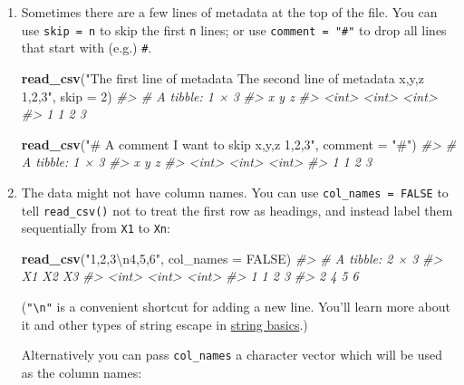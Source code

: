 \documentclass[]{book}
\newenvironment{Shaded}{\begin{snugshade}}{\end{snugshade}}
\newcommand{\KeywordTok}[1]{\textcolor[rgb]{0.13,0.29,0.53}{\textbf{{#1}}}}
\newcommand{\DataTypeTok}[1]{\textcolor[rgb]{0.13,0.29,0.53}{{#1}}}
\newcommand{\DecValTok}[1]{\textcolor[rgb]{0.00,0.00,0.81}{{#1}}}
\newcommand{\CharTok}[1]{\textcolor[rgb]{0.31,0.60,0.02}{{#1}}}
\newcommand{\StringTok}[1]{\textcolor[rgb]{0.31,0.60,0.02}{{#1}}}
\newcommand{\CommentTok}[1]{\textcolor[rgb]{0.56,0.35,0.01}{\textit{{#1}}}}
\newcommand{\OtherTok}[1]{\textcolor[rgb]{0.56,0.35,0.01}{{#1}}}
\newcommand{\NormalTok}[1]{{#1}}
\begin{document}
\begin{enumerate}
\def\labelenumi{\arabic{enumi}.}
\item
  Sometimes there are a few lines of metadata at the top of the file.
  You can use \texttt{skip\ =\ n} to skip the first \texttt{n} lines; or
  use \texttt{comment\ =\ "\#"} to drop all lines that start with (e.g.)
  \texttt{\#}.

\begin{Shaded}
\begin{Highlighting}[]
\KeywordTok{read_csv}\NormalTok{(}\StringTok{"The first line of metadata}
\StringTok{  The second line of metadata}
\StringTok{  x,y,z}
\StringTok{  1,2,3"}\NormalTok{, }\DataTypeTok{skip =} \DecValTok{2}\NormalTok{)}
\CommentTok{#> # A tibble: 1 × 3}
\CommentTok{#>       x     y     z}
\CommentTok{#>   <int> <int> <int>}
\CommentTok{#> 1     1     2     3}

\KeywordTok{read_csv}\NormalTok{(}\StringTok{"# A comment I want to skip}
\StringTok{  x,y,z}
\StringTok{  1,2,3"}\NormalTok{, }\DataTypeTok{comment =} \StringTok{"#"}\NormalTok{)}
\CommentTok{#> # A tibble: 1 × 3}
\CommentTok{#>       x     y     z}
\CommentTok{#>   <int> <int> <int>}
\CommentTok{#> 1     1     2     3}
\end{Highlighting}
\end{Shaded}
\item
  The data might not have column names. You can use
  \texttt{col\_names\ =\ FALSE} to tell \texttt{read\_csv()} not to
  treat the first row as headings, and instead label them sequentially
  from \texttt{X1} to \texttt{Xn}:

\begin{Shaded}
\begin{Highlighting}[]
\KeywordTok{read_csv}\NormalTok{(}\StringTok{"1,2,3}\CharTok{\textbackslash{}n}\StringTok{4,5,6"}\NormalTok{, }\DataTypeTok{col_names =} \OtherTok{FALSE}\NormalTok{)}
\CommentTok{#> # A tibble: 2 × 3}
\CommentTok{#>      X1    X2    X3}
\CommentTok{#>   <int> <int> <int>}
\CommentTok{#> 1     1     2     3}
\CommentTok{#> 2     4     5     6}
\end{Highlighting}
\end{Shaded}

  (\texttt{"\textbackslash{}n"} is a convenient shortcut for adding a
  new line. You'll learn more about it and other types of string escape
  in \protect\hyperlink{string-basics}{string basics}.)

  Alternatively you can pass \texttt{col\_names} a character vector
  which will be used as the column names:


\end{enumerate}
\end{document}
